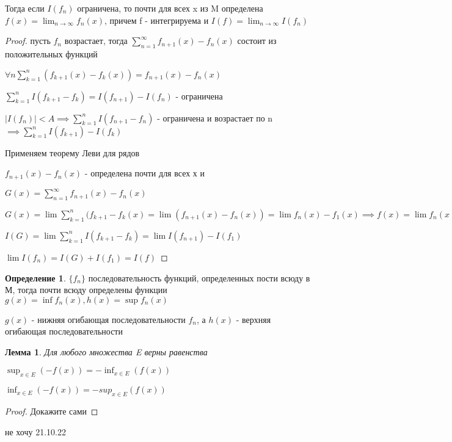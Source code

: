 \documentclass[a4paper, 12pt]{article}
\newtheorem{lemma}{Лемма}[section]
\theoremstyle{definition}
\newtheorem*{definition}{Определение}
\theoremstyle{remark}
\begin{document}
Тогда если $I(f_n)$ ограничена, то почти для всех x из M определена $f(x) = \lim_{n\to\infty}f_n(x)$, причем
f - интегрируема и $I(f) = \lim_{n\to\infty} I(f_n)$
\begin{proof}
     пусть $f_n$ возрастает, тогда $\sum_{n = 1}^{\infty} f_{n+1}(x)-f_n(x)$ состоит из положительных функций 

     $\forall n \sum_{k = 1}^{n} (f_{k+1}(x) - f_k(x)) = f_{n+1}(x) - f_n(x)$

     $\sum_{k = 1}^{n}I(f_{k+1} - f_k) = I(f_{n+1}) - I(f_n)$ - ограничена 
     
     $|I(f_n)|< A \implies \sum_{k = 1}^{n} I(f_{n+1} - f_n)$ - ограничена и возрастает по n $\implies \sum_{k = 1}^{n} I(f_{k+1}) - I(f_k)  $

     Применяем теорему Леви для рядов

     $f_{n+1}(x) - f_n(x)$ - определена почти для всех х и

    $ G(x) = \sum_{n = 1}^{\infty}  f_{n+1}(x) - f_n(x)$

    $ G(x) = \lim \sum_{k = 1}^{n} (f_{k+1} - f_k(x) = \lim (f_{n+1}(x) - f_n(x)) = \lim f_n(x) - f_1(x)\implies f(x) = \lim f_n(x) = G(x) + f_1(x)$
     
     $I(G) = \lim\sum_{k = 1}^{n} I(f_{k+1} - f_k) = \lim I(f_{n+1}) - I(f_1)$
     
     $\lim I(f_n) = I(G) + I(f_1) = I(f)$
\end{proof}
\begin{definition}
     $\{f_n\}$ последовательность функций, определенных пости всюду в М, тогда почти всюду определены функции
     $g(x) = \inf{f_n(x)}, h(x) = \sup{f_n(x)}$

     $g(x)$ - нижняя огибающая последовательности $f_n$, а $h(x)$ - верхняя огибающая последовательности
\end{definition}
\begin{lemma}
     Для любого множества E верны равенства

     $\sup_{x\in E}(-f(x)) = -\inf_{x\in E}(f(x))$

     $\inf_{x\in E}(-f(x)) = -sup_{x\in E}(f(x))$
\end{lemma}
\begin{proof}
     Докажите сами
\end{proof}
не хочу
21.10.22
\end{document}
